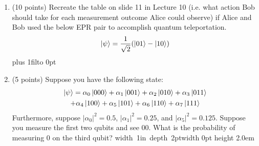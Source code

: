 \documentclass[12pt]{article}
\newcommand{\Blank}{\mbox{\hskip 4pt\vrule width 1in depth 2pt}\vrule width 0pt height 2.0em}
\def\DefaultSpace{1in}
\newcommand{\LeaveSpace}[1][\DefaultSpace]{%
\vskip #1 plus 1fil\relax\hbox to 0pt{\hss} %
}
\begin{document}
\begin{enumerate}[font=\bfseries]
    \item (10 points) Recreate the table on slide 11 in Lecture 10 (i.e. what action Bob should take for each measurement outcome Alice could observe) if Alice and Bob used the below EPR pair to accomplish quantum teleportation.
    \[\ket{\psi} = \frac{1}{\sqrt{2}}(\ket{01}-\ket{10})\]
    \LeaveSpace[2.25in]
    \item (5 points) Suppose you have the following state:
    \begin{multline} \ket{\psi} = 
        \alpha_0\ket{000} + \alpha_1\ket{001} +
                    \alpha_2\ket{010} + \alpha_3\ket{011}  \\
                    + \alpha_4\ket{100} + \alpha_5\ket{101} +
                    \alpha_6\ket{110} + \alpha_7\ket{111}
    \end{multline}
    Furthermore, suppose $|\alpha_0|^2 = 0.5$, $|\alpha_1|^2 = 0.25$, and $|\alpha_5|^2 = 0.125$. Suppose you measure the first two qubits and see $00$. What is the probability of measuring 0 on the third qubit? \Blank{}

\end{enumerate}
\end{document}
